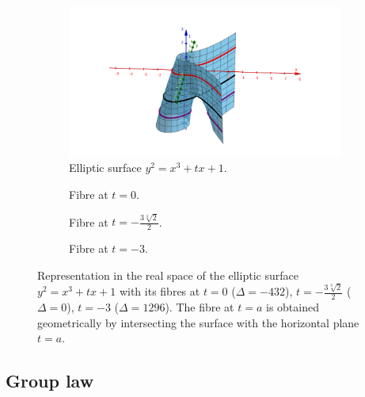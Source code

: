 \documentclass{report}
\theoremstyle{definition}
\begin{document}
\begin{figure}[!ht]
\begin{center}
\begin{subfigure}{\textwidth}
\centering
\includegraphics[scale=0.5]{../images/elliptic-surface.png}
\caption{Elliptic surface $y^2=x^3+tx+1$.}
\end{subfigure}
\vspace{10mm}

\begin{subfigure}{0.3\textwidth}
\centering
{}
\caption{Fibre at $t=0$.}
\end{subfigure}
\begin{subfigure}{0.3\textwidth}
\centering
{}
\caption{Fibre at $t=-\frac{3\sqrt[3]{2}}{2}$.}
\end{subfigure}
\begin{subfigure}{0.3\textwidth}
\centering
{}
\caption{Fibre at $t=-3$.}
\end{subfigure}
\caption{Representation in the real space of the elliptic surface $y^2=x^3+tx+1$ with its fibres at $t=0$ ($\Delta=-432$), $t=-\frac{3\sqrt[3]{2}}{2}$ ($\Delta=0$), $t=-3$ ($\Delta=1296$). The fibre at $t=a$ is obtained geometrically by intersecting the surface with the horizontal plane $t=a$.}
\label{fig:elliptic-surface}
\end{center}
\end{figure}

\subsection{Group law}
\end{document}

